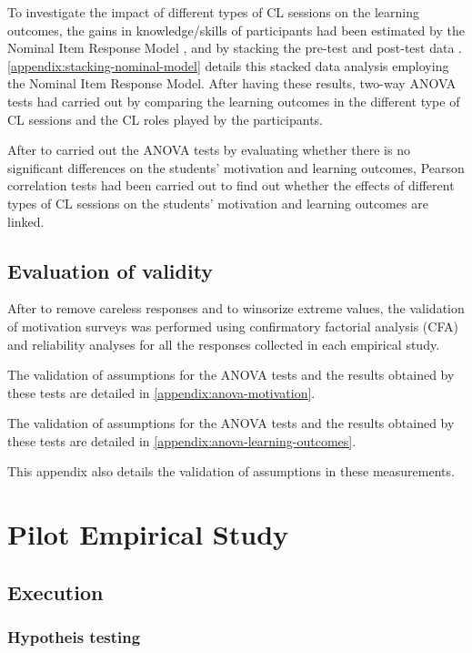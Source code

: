 To investigate the impact of different types of CL sessions on the learning outcomes, the gains in knowledge/skills of participants had been estimated by the Nominal Item Response Model \cite{DavidThissenLiCaiRDarrellBock2010}, and by stacking the pre-test and post-test data \cite{Wright2003}. \autoref{appendix:stacking-nominal-model} details this stacked data analysis employing the Nominal Item Response Model. After having these results, two-way ANOVA tests had carried out by comparing the learning outcomes in the different type of CL sessions and the CL roles played by the participants.

After to carried out the ANOVA tests by evaluating whether there is no significant differences on the students' motivation and learning outcomes, Pearson correlation tests had been carried out to find out whether the effects of different types of CL sessions on the students' motivation and learning outcomes are linked.

\subsection{Evaluation of validity}



After to remove careless responses and to winsorize extreme values, the validation of motivation surveys was performed using confirmatory factorial analysis (CFA) and reliability analyses for all the responses collected in each empirical study.

The validation of assumptions for the ANOVA tests and the results obtained by these tests are detailed in \autoref{appendix:anova-motivation}.

 The validation of assumptions for the ANOVA tests and the results obtained by these tests are detailed in \autoref{appendix:anova-learning-outcomes}.

This appendix also details the validation of assumptions in these measurements. 

\section{Pilot Empirical Study}
\label{sec:pilot-study}

\subsection{Execution}

\subsubsection{Hypotheis testing}

